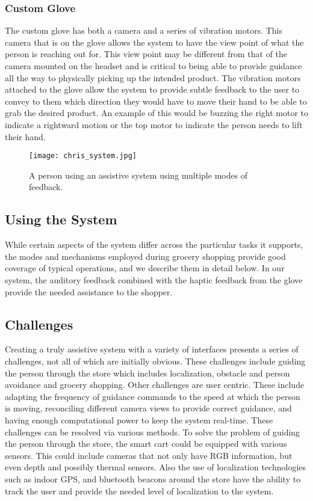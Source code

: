 \subsubsection{Custom Glove}
The custom glove has both a camera and a series of vibration motors.
This camera that is on the glove allows the system to have the view
 point of what the person is reaching out for. This view point may be different from
that of the camera mounted on the headset and is critical to being able to provide
guidance all the way to physically picking up the intended product.
The vibration motors attached to the glove allow the system to provide
subtle feedback to the user to convey to them which direction they would
have to move their hand to be able to grab the desired product. An
example of this would be buzzing the right motor to indicate a
rightward motion or the top motor to indicate the person needs to lift
their hand.

\begin{figure}[!htb]
\centering
\vspace{-5pt}
\texttt{[image: chris\_system.jpg]}
\caption{ A person using an assistive system using multiple modes of feedback.}
\label{fig:whole_system_chris}
\end{figure}

\subsection{Using the System}
While certain aspects of the system differ across the particular tasks it supports, 
the modes and mechanisms employed during grocery shopping provide good coverage of typical operations, and we describe them in detail below.
In our system, the auditory feedback combined with the haptic feedback from the glove provide the needed assistance to the shopper. 
 
\subsection{Challenges}
Creating a truly assistive system with a variety of interfaces presents a series 
of challenges, not all of which are initially obvious. These challenges include guiding the person
through the store which includes localization, obstacle and person avoidance and grocery shopping. 
Other challenges are user centric. These include adapting the frequency of guidance commands to the speed at which the person is moving, 
reconciling different camera views to provide correct guidance, and having enough computational power to keep the system real-time. 
These challenges can be resolved via various methods. To solve the problem of guiding the person through the store, the smart cart could be equipped with various sensors. 
This could include cameras that not only have RGB information, but even depth and possibly thermal sensors. 
Also the use of localization technologies such as indoor GPS, and bluetooth beacons around the store have the ability to track the user and 
provide the needed level of localization to the system.


